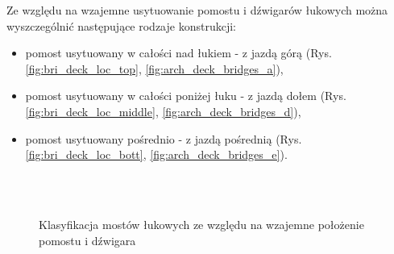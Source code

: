 Ze względu na wzajemne usytuowanie pomostu i dźwigarów łukowych można wyszczególnić następujące rodzaje konstrukcji:
\begin{itemize}[noitemsep]
	\item pomost usytuowany w całości nad łukiem - z jazdą górą (Rys. \ref{fig:bri_deck_loc_top}, \ref{fig:arch_deck_bridges_a}),
	\item pomost usytuowany w całości poniżej łuku - z jazdą dołem (Rys. \ref{fig:bri_deck_loc_middle}, \ref{fig:arch_deck_bridges_d}),
	\item pomost usytuowany pośrednio - z jazdą pośrednią (Rys. \ref{fig:bri_deck_loc_bott}, \ref{fig:arch_deck_bridges_e}).
\end{itemize}

\begin{figure}[hbt!]
	\centering
	  \\
	 \\
	\captionsetup{justification=centering}
	\caption{Klasyfikacja mostów łukowych ze względu na wzajemne położenie pomostu i dźwigara}
	\label{fig:bridges_types_deck_location}
\end{figure}

%	

